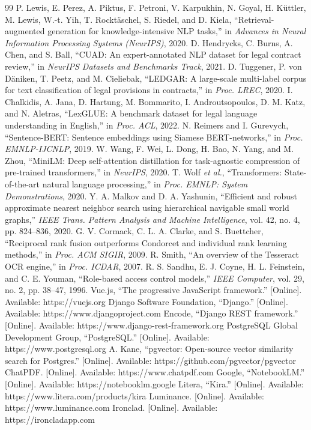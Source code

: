 \begin{thebibliography}{99}
 P. Lewis, E. Perez, A. Piktus, F. Petroni, V. Karpukhin, N. Goyal, H. K\"uttler, M. Lewis, W.-t. Yih, T. Rockt\"aschel, S. Riedel, and D. Kiela, ``Retrieval-augmented generation for knowledge-intensive NLP tasks,'' in \emph{Advances in Neural Information Processing Systems (NeurIPS)}, 2020.
 D. Hendrycks, C. Burns, A. Chen, and S. Ball, ``CUAD: An expert-annotated NLP dataset for legal contract review,'' in \emph{NeurIPS Datasets and Benchmarks Track}, 2021.
 D. Tuggener, P. von D\"aniken, T. Peetz, and M. Cieliebak, ``LEDGAR: A large-scale multi-label corpus for text classification of legal provisions in contracts,'' in \emph{Proc. LREC}, 2020.
 I. Chalkidis, A. Jana, D. Hartung, M. Bommarito, I. Androutsopoulos, D. M. Katz, and N. Aletras, ``LexGLUE: A benchmark dataset for legal language understanding in English,'' in \emph{Proc. ACL}, 2022.
 N. Reimers and I. Gurevych, ``Sentence-BERT: Sentence embeddings using Siamese BERT-networks,'' in \emph{Proc. EMNLP-IJCNLP}, 2019.
 W. Wang, F. Wei, L. Dong, H. Bao, N. Yang, and M. Zhou, ``MiniLM: Deep self-attention distillation for task-agnostic compression of pre-trained transformers,'' in \emph{NeurIPS}, 2020.
 T. Wolf \emph{et al.}, ``Transformers: State-of-the-art natural language processing,'' in \emph{Proc. EMNLP: System Demonstrations}, 2020.
 Y. A. Malkov and D. A. Yashunin, ``Efficient and robust approximate nearest neighbor search using hierarchical navigable small world graphs,'' \emph{IEEE Trans. Pattern Analysis and Machine Intelligence}, vol. 42, no. 4, pp. 824--836, 2020.
 G. V. Cormack, C. L. A. Clarke, and S. Buettcher, ``Reciprocal rank fusion outperforms Condorcet and individual rank learning methods,'' in \emph{Proc. ACM SIGIR}, 2009.
 R. Smith, ``An overview of the Tesseract OCR engine,'' in \emph{Proc. ICDAR}, 2007.
 R. S. Sandhu, E. J. Coyne, H. L. Feinstein, and C. E. Youman, ``Role-based access control models,'' \emph{IEEE Computer}, vol. 29, no. 2, pp. 38--47, 1996.
 Vue.js, ``The progressive JavaScript framework.'' [Online]. Available: https://vuejs.org
 Django Software Foundation, ``Django.'' [Online]. Available: https://www.djangoproject.com
 Encode, ``Django REST framework.'' [Online]. Available: https://www.django-rest-framework.org
 PostgreSQL Global Development Group, ``PostgreSQL.'' [Online]. Available: https://www.postgresql.org
 A. Kane, ``pgvector: Open-source vector similarity search for Postgres.'' [Online]. Available: https://github.com/pgvector/pgvector
 ChatPDF. [Online]. Available: https://www.chatpdf.com
 Google, ``NotebookLM.'' [Online]. Available: https://notebooklm.google
 Litera, ``Kira.'' [Online]. Available: https://www.litera.com/products/kira
 Luminance. [Online]. Available: https://www.luminance.com
 Ironclad. [Online]. Available: https://ironcladapp.com
\end{thebibliography}
